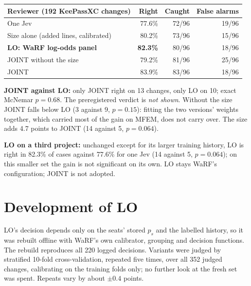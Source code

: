 \documentclass[11pt,a4paper]{article}
\begin{document}
\begin{center}
\begin{tabular}{lrrr}
\toprule
Reviewer (192 KeePassXC changes) & Right & Caught & False alarms \\
\midrule
One Jev                                   & 77.6\% & 72/96 & 19/96 \\
Size alone (added lines, calibrated)      & 80.2\% & 73/96 & 15/96 \\
\textbf{LO: WaRF log-odds panel}          & \textbf{82.3\%} & 80/96 & 18/96 \\
JOINT without the size                    & 79.2\% & 81/96 & 25/96 \\
JOINT                                     & 83.9\% & 83/96 & 18/96 \\
\bottomrule
\end{tabular}
\end{center}

\textbf{JOINT against LO:} only JOINT right on 13 changes, only LO on 10;
exact McNemar $p = 0.68$. The preregistered verdict is \emph{not shown}.
Without the size JOINT falls below LO (3 against 9, $p = 0.15$): fitting the
two versions' weights together, which carried most of the gain on MFEM, does
not carry over. The size adds 4.7 points to JOINT (14 against 5, $p = 0.064$).

\textbf{LO on a third project:} unchanged except for its larger training
history, LO is right in 82.3\% of cases against 77.6\% for one Jev (14 against
5, $p = 0.064$); on this smaller set the gain is not significant on its own.
LO stays WaRF's configuration; JOINT is not adopted.

\section{Development of LO}

LO's decision depends only on the seats' stored $p_s$ and the labelled history,
so it was rebuilt offline with WaRF's own calibrator, grouping and decision
functions. The rebuild reproduces all 220 logged decisions. Variants were judged
by stratified 10-fold cross-validation, repeated five times, over all 352 judged
changes, calibrating on the training folds only; no further look at the fresh
set was spent. Repeats vary by about $\pm 0.4$ points.
\end{document}
